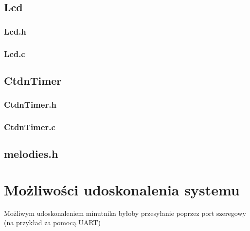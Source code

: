 \documentclass[fleqn]{article}
\begin{document}
\pagebreak

\subsection{Lcd}

\noindent\begin{minipage}[t]{.45\textwidth}
	\subsubsection{Lcd.h}
	
\end{minipage}\hfill
\noindent\begin{minipage}[t]{.45\textwidth}
	\subsubsection{Lcd.c}
	
\end{minipage}\hfill

\pagebreak

\noindent\begin{minipage}[t]{.45\textwidth}
\subsection{CtdnTimer}
\subsubsection{CtdnTimer.h}

\subsubsection{CtdnTimer.c}

\end{minipage}\hfill
\noindent\begin{minipage}[t]{.45\textwidth}
\subsection{melodies.h}

\end{minipage}\hfill

\pagebreak

\section{Możliwości udoskonalenia systemu}
Możliwym udoskonaleniem minutnika byłoby przesyłanie poprzez port szeregowy (na przykład za pomocą UART)
\end{document}
